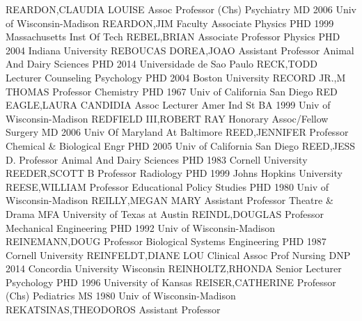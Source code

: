 \documentclass[
]{article}
\begin{document}
\textbar REARDON,CLAUDIA LOUISE \textbar Assoc Professor (Chs)
\textbar Psychiatry \textbar MD 2006 Univ of Wisconsin-Madison
\textbar{}  \textbar REARDON,JIM \textbar Faculty Associate
\textbar Physics \textbar PHD 1999 Massachusetts Inst Of Tech \textbar{}
 \textbar REBEL,BRIAN \textbar Associate Professor
\textbar Physics \textbar PHD 2004 Indiana University \textbar{}
 \textbar REBOUCAS DOREA,JOAO \textbar Assistant Professor
\textbar Animal And Dairy Sciences \textbar PHD 2014 Universidade de Sao
Paulo \textbar{}  \textbar RECK,TODD \textbar Lecturer
\textbar Counseling Psychology \textbar PHD 2004 Boston University
\textbar{}  \textbar RECORD JR.,M THOMAS \textbar Professor
\textbar Chemistry \textbar PHD 1967 Univ of California San Diego
\textbar{}  \textbar RED EAGLE,LAURA CANDIDIA \textbar Assoc
Lecturer \textbar Amer Ind St \textbar BA 1999 Univ of Wisconsin-Madison
\textbar{}  \textbar REDFIELD III,ROBERT RAY
\textbar Honorary Assoc/Fellow \textbar Surgery \textbar MD 2006 Univ Of
Maryland At Baltimore \textbar{}  \textbar REED,JENNIFER
\textbar Professor \textbar Chemical \& Biological Engr \textbar PHD
2005 Univ of California San Diego \textbar{} 
\textbar REED,JESS D. \textbar Professor \textbar Animal And Dairy
Sciences \textbar PHD 1983 Cornell University \textbar{} 
\textbar REEDER,SCOTT B \textbar Professor \textbar Radiology
\textbar PHD 1999 Johns Hopkins University \textbar{} 
\textbar REESE,WILLIAM \textbar Professor \textbar Educational Policy
Studies \textbar PHD 1980 Univ of Wisconsin-Madison \textbar{}
 \textbar REILLY,MEGAN MARY \textbar Assistant Professor
\textbar Theatre \& Drama \textbar MFA University of Texas at Austin
\textbar{}  \textbar REINDL,DOUGLAS \textbar Professor
\textbar Mechanical Engineering \textbar PHD 1992 Univ of
Wisconsin-Madison \textbar{}  \textbar REINEMANN,DOUG
\textbar Professor \textbar Biological Systems Engineering \textbar PHD
1987 Cornell University \textbar{}  \textbar REINFELDT,DIANE
LOU \textbar Clinical Assoc Prof \textbar Nursing \textbar DNP 2014
Concordia University Wisconsin \textbar{} 
\textbar REINHOLTZ,RHONDA \textbar Senior Lecturer \textbar Psychology
\textbar PHD 1996 University of Kansas \textbar{} 
\textbar REISER,CATHERINE \textbar Professor (Chs) \textbar Pediatrics
\textbar MS 1980 Univ of Wisconsin-Madison \textbar{} 
\textbar REKATSINAS,THEODOROS \textbar Assistant Professor
\end{document}
